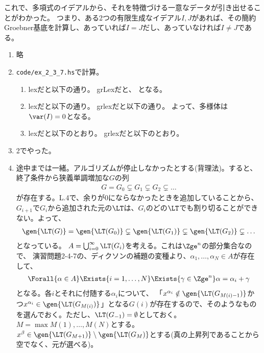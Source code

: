 これで、多項式のイデアルから、それを特徴づける一意なデータが引き出せることがわかった。
つまり、ある2つの有限生成なイデアル$I,J$があれば、その簡約Groebner基底を計算し、あっていれば$I=J$だし、あっていなければ$I\neq J$である。

\begin{enumerate}[label=(問題\arabic*)]
  \item 略
  \item {\tt code/ex_2_3_7.hs}で計算。
  \begin{enumerate}[label=(\alph*)]
    \item lexだと以下の通り。
    grLexだと、
    となる。
    \item lexだと以下の通り。
    grlexだと以下の通り。
    よって、多様体は$\var(I) = 0$となる。
    \item
    lexだと以下のとおり。
    grlexだと以下のとおり。
  \end{enumerate}
  \item 2でやった。
  \item 途中までは一緒。アルゴリズムが停止しなかったとする(背理法)。すると、終了条件から狭義単調増加な$G$の列
  \begin{align}
    G = G_0 \subsetneq G_1 \subsetneq G_2 \subsetneq \dots
  \end{align}
  が存在する。L.4で、余りが0にならなかったときを追加していることから、
  $G_{i+1}$で$G_{i}$から追加された元の$\LT$は、$G_{i}$のどの$\LT$でも割り切ることができない。よって、
  \begin{align}
    \gen{\LT(G)} = \gen{\LT(G_0)} \subsetneq \gen{\LT(G_1)} \subsetneq \gen{\LT(G_2)} \subsetneq \dots
  \end{align}
  となっている。
  $A=\bigcup_{i=0}^\infty \LT(G_i)$を考える。これは$\Zge^n$の部分集合なので、
  演習問題2-4-7の、ディクソンの補題の変種より、$\alpha_1,\dots,\alpha_N \in A$が存在して、
  \begin{align}
    \Forall{\alpha \in A}\Exists{i=1,\dots,N}\Exists{\gamma \in \Zge^n} \alpha = \alpha_i + \gamma
    \label{ディクソンの補題の変種}
  \end{align}
  となる。各$i$とそれに付随する$\alpha_i$について、
  「$x^{\alpha_i} \notin \gen{\LT(G_{M(i)-1})}$かつ$x^{\alpha_i} \in \gen{\LT(G_{M(i)})}$」となる$G(i)$が存在するので、そのようなものを選んでおく。ただし、$\LT(G_{-1})=\emptyset$としておく。$M=\max{M(1),\dots,M(N)}$とする。$x^\beta \in \gen{\LT(G_{M+1})}\setminus \gen{\LT(G_M)}$とする(真の上昇列であることから空でなく、元が選べる)。

\end{enumerate}
